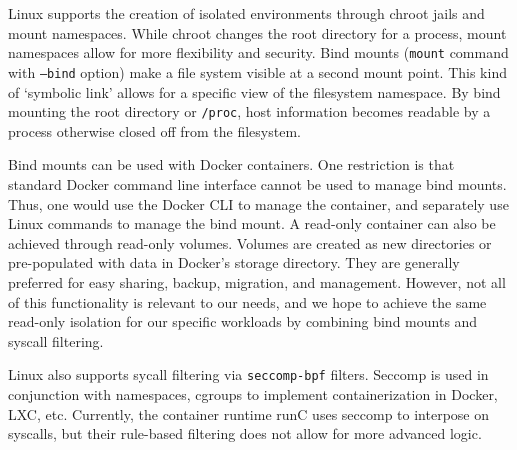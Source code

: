 \documentclass{proc}
\begin{document}
Linux supports the creation of isolated environments through chroot jails and mount namespaces. While chroot changes the root directory for a process, mount namespaces allow for more flexibility and security. Bind mounts (\texttt{mount} command with \texttt{--bind} option) make a file system visible at a second mount point\cite{bindmount}. This kind of `symbolic link' allows for a specific view of the filesystem namespace. By bind mounting the root directory or \texttt{/proc}, host information becomes readable by a process otherwise closed off from the filesystem.

Bind mounts can be used with Docker containers. One restriction is that standard Docker command line interface cannot be used to manage bind mounts. Thus, one would use the Docker CLI to manage the container, and separately use Linux commands to manage the bind mount. A read-only container can also be achieved through read-only volumes. Volumes are created as new directories or pre-populated with data in Docker's storage directory. They are generally preferred for easy sharing, backup, migration, and management. However, not all of this functionality is relevant to our needs, and we hope to achieve the same read-only isolation for our specific workloads by combining bind mounts and syscall filtering.

Linux also supports sycall filtering via \texttt{seccomp-bpf} filters. Seccomp is used in conjunction with namespaces, cgroups to implement containerization in Docker, LXC, etc. Currently, the container runtime runC uses seccomp to interpose on syscalls, but their rule-based filtering does not allow for more advanced logic.


\end{document}
